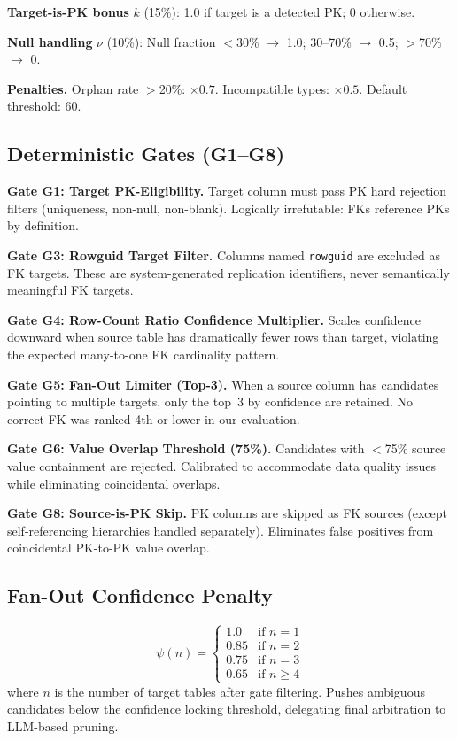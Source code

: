 \documentclass[sigconf, nonacm]{acmart}
\begin{document}
\textbf{Target-is-PK bonus} $k$ (15\%): 1.0 if target is a detected PK; 0 otherwise.

\textbf{Null handling} $\nu$ (10\%): Null fraction $<$30\% $\to$ 1.0; 30--70\% $\to$ 0.5; $>$70\% $\to$ 0.

\textbf{Penalties.} Orphan rate $>$20\%: $\times 0.7$. Incompatible types: $\times 0.5$. Default threshold: 60.

\subsection{Deterministic Gates (G1--G8)}

\textbf{Gate G1: Target PK-Eligibility.} Target column must pass PK hard rejection filters (uniqueness, non-null, non-blank). Logically irrefutable: FKs reference PKs by definition.

\textbf{Gate G3: Rowguid Target Filter.} Columns named \texttt{rowguid} are excluded as FK targets. These are system-generated replication identifiers, never semantically meaningful FK targets.

\textbf{Gate G4: Row-Count Ratio Confidence Multiplier.} Scales confidence downward when source table has dramatically fewer rows than target, violating the expected many-to-one FK cardinality pattern.

\textbf{Gate G5: Fan-Out Limiter (Top-3).} When a source column has candidates pointing to multiple targets, only the top~3 by confidence are retained. No correct FK was ranked 4th or lower in our evaluation.

\textbf{Gate G6: Value Overlap Threshold (75\%).} Candidates with $<$75\% source value containment are rejected. Calibrated to accommodate data quality issues while eliminating coincidental overlaps.

\textbf{Gate G8: Source-is-PK Skip.} PK columns are skipped as FK sources (except self-referencing hierarchies handled separately). Eliminates false positives from coincidental PK-to-PK value overlap.

\subsection{Fan-Out Confidence Penalty}

\begin{equation}
\psi(n) = \begin{cases} 1.0 & \text{if } n = 1 \\ 0.85 & \text{if } n = 2 \\ 0.75 & \text{if } n = 3 \\ 0.65 & \text{if } n \geq 4 \end{cases}
\end{equation}
where $n$ is the number of target tables after gate filtering. Pushes ambiguous candidates below the confidence locking threshold, delegating final arbitration to LLM-based pruning.
\end{document}
